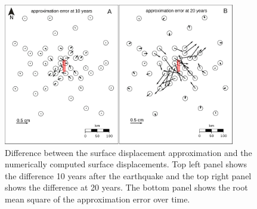 \documentclass[extra]{gji}
\begin{document}
\begin{figure}[h!]\label{figure6}
  \centering
  \includegraphics[width=0.9\textwidth]{FinalFigures/Figure7.pdf}
  \caption{Difference between the surface displacement approximation
    and the numerically computed surface displacements.  Top left
    panel shows the difference 10 years after the earthquake and the
    top right panel shows the difference at 20 years.  The bottom
    panel shows the root mean square of the approximation error over
    time.}
  \label{figure 6}
\end{figure}
\end{document}
